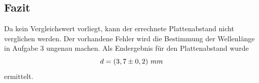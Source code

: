 \subsection{Fazit}
Da kein Vergleichswert vorliegt, kann der errechnete Plattenabstand nicht verglichen werden. Der vorhandene Fehler wird die Bestimmung der Wellenlänge in Aufgabe 3 ungenau machen. Als Endergebnis für den Plattenabstand wurde
\begin{equation}
d = \left( 3,7 \pm 0,2 \right)\,mm
\notag
\end{equation}
ermittelt.